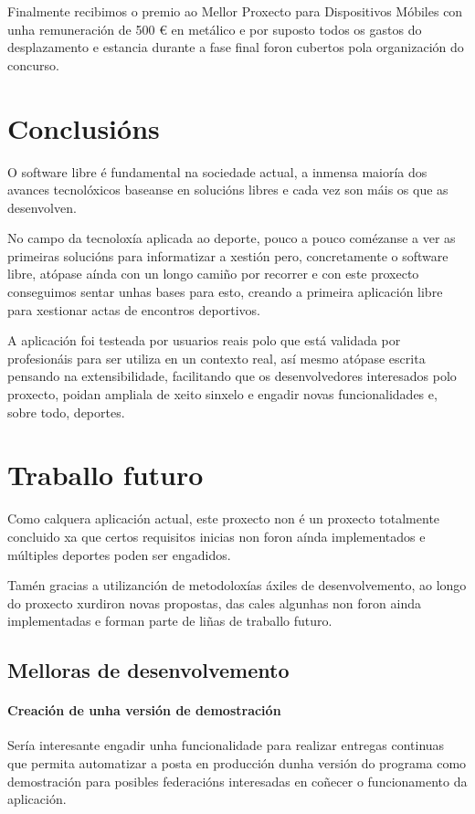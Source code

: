   Finalmente recibimos o premio ao Mellor Proxecto para Dispositivos Móbiles 
con unha remuneración de 500 \euro{} en metálico e por suposto todos os gastos 
do desplazamento e estancia durante a fase final foron cubertos pola 
organización do concurso.

\section{Conclusións}
O software libre é fundamental na sociedade actual, a inmensa maioría dos 
avances tecnolóxicos baseanse en solucións libres e cada vez son máis os que  
as desenvolven.

  No campo da tecnoloxía aplicada ao deporte, pouco a pouco comézanse a ver as 
primeiras solucións para informatizar a xestión pero, concretamente o 
software libre, atópase aínda con un longo camiño por recorrer e con este 
proxecto conseguimos sentar unhas bases para esto, creando a primeira 
aplicación libre para xestionar actas de encontros deportivos.

  A aplicación foi testeada por usuarios reais polo que está validada 
por profesionáis para ser utiliza en un contexto real, así mesmo atópase 
escrita pensando na extensibilidade, facilitando que os desenvolvedores 
interesados polo proxecto, poidan ampliala de xeito sinxelo e engadir novas 
funcionalidades e, sobre todo, deportes.


\section{Traballo futuro}
Como calquera aplicación actual, este proxecto non é un proxecto totalmente 
concluido xa que certos requisitos inicias non foron aínda implementados e 
múltiples deportes poden ser engadidos.

Tamén gracias a utilizanción de metodoloxías áxiles de desenvolvemento, ao 
longo do proxecto xurdiron novas propostas, das cales algunhas non foron 
ainda implementadas e forman parte de liñas de traballo futuro.

  \subsection{Melloras de desenvolvemento}

    \paragraph{Creación de unha versión de demostración} Sería interesante 
engadir unha funcionalidade para realizar entregas continuas que permita 
automatizar a posta en producción dunha versión do programa como demostración 
para posibles federacións interesadas en coñecer o funcionamento da aplicación.

